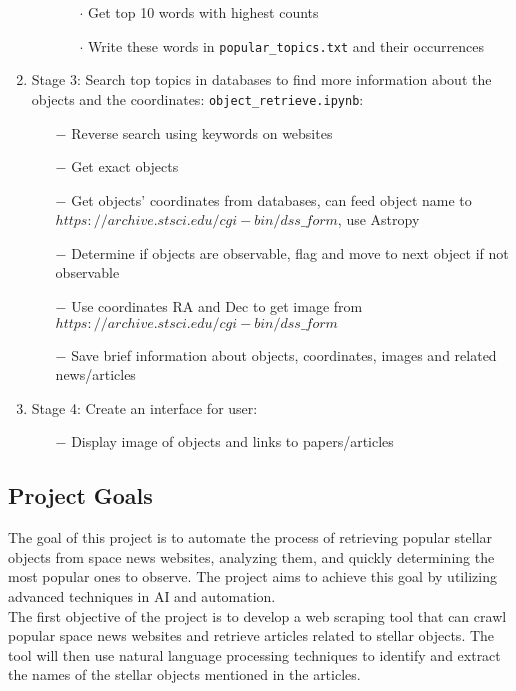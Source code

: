 \documentclass[12pt,letterpaper]{article}
\begin{document}
\begin{enumerate}[leftmargin=*]
\begin{enumerate}
\begin{enumerate}[leftmargin=*]
                \item[$\cdot$]Get top 10 words with highest counts
                \item[$\cdot$]Write these words in \texttt{popular\_topics.txt} and their occurrences
            \end{enumerate}
        \end{enumerate}
    \item Stage 3: Search top topics in databases to find more information 
    about the objects and the coordinates: \texttt{object\_retrieve.ipynb}:
    \begin{enumerate}
        \item [$-$] Reverse search using keywords on websites
        \item [$-$] Get exact objects
        \item [$-$] Get objects' coordinates from databases, can feed object name to $https://archive.stsci.edu/cgi-bin/dss\_form$, use Astropy
        \item [$-$] Determine if objects are observable, flag and move to next object if not observable
        \item [$-$] Use coordinates RA and Dec to get image from $https://archive.stsci.edu/cgi-bin/dss\_form$
        \item [$-$] Save brief information about objects, coordinates, images and related news/articles
    \end{enumerate}
    \item Stage 4: Create an interface for user:
    \begin{enumerate}
        \item [$-$] Display image of objects and links to papers/articles
    \end{enumerate}
\end{enumerate}

\subsection*{Project Goals}
The goal of this project is to automate the process of retrieving popular stellar objects 
from space news websites, analyzing them, and quickly determining the most popular ones to observe. 
The project aims to achieve this goal by utilizing advanced techniques in AI and automation.\\

The first objective of the project is to develop a web scraping tool that can 
crawl popular space news websites and retrieve articles related to stellar objects. 
The tool will then use natural language processing techniques to identify and extract 
the names of the stellar objects mentioned in the articles.\\
\end{document}
